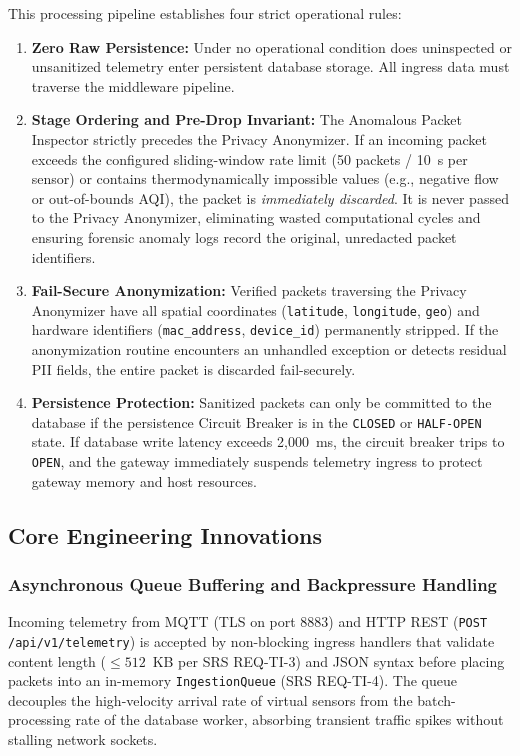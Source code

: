 This processing pipeline establishes four strict operational rules:
\begin{enumerate}[label=(\roman*)]
    \item \textbf{Zero Raw Persistence:} Under no operational condition does uninspected or unsanitized telemetry enter persistent database storage. All ingress data must traverse the middleware pipeline.
    \item \textbf{Stage Ordering and Pre-Drop Invariant:} The Anomalous Packet Inspector strictly precedes the Privacy Anonymizer. If an incoming packet exceeds the configured sliding-window rate limit (50 packets / 10~s per sensor) or contains thermodynamically impossible values (e.g., negative flow or out-of-bounds AQI), the packet is \emph{immediately discarded}. It is never passed to the Privacy Anonymizer, eliminating wasted computational cycles and ensuring forensic anomaly logs record the original, unredacted packet identifiers.
    \item \textbf{Fail-Secure Anonymization:} Verified packets traversing the Privacy Anonymizer have all spatial coordinates (\texttt{latitude}, \texttt{longitude}, \texttt{geo}) and hardware identifiers (\texttt{mac\_address}, \texttt{device\_id}) permanently stripped. If the anonymization routine encounters an unhandled exception or detects residual PII fields, the entire packet is discarded fail-securely.
    \item \textbf{Persistence Protection:} Sanitized packets can only be committed to the database if the persistence Circuit Breaker is in the \texttt{CLOSED} or \texttt{HALF-OPEN} state. If database write latency exceeds 2,000~ms, the circuit breaker trips to \texttt{OPEN}, and the gateway immediately suspends telemetry ingress to protect gateway memory and host resources.
\end{enumerate}

\subsection{Core Engineering Innovations}

\subsubsection{Asynchronous Queue Buffering and Backpressure Handling}
Incoming telemetry from MQTT (TLS on port 8883) and HTTP REST (\texttt{POST /api/v1/telemetry}) is accepted by non-blocking ingress handlers that validate content length ($\le 512$~KB per SRS REQ-TI-3) and JSON syntax before placing packets into an in-memory \texttt{IngestionQueue} (SRS REQ-TI-4). The queue decouples the high-velocity arrival rate of virtual sensors from the batch-processing rate of the database worker, absorbing transient traffic spikes without stalling network sockets.

